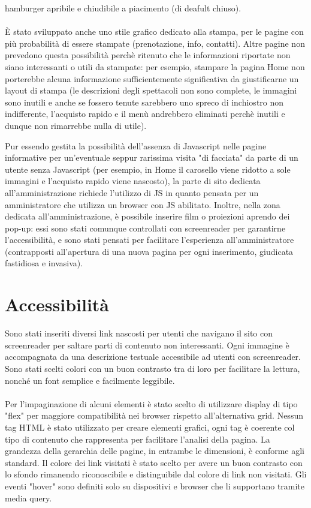 \documentclass[a4paper, 12pt]{article}
\begin{document}
hamburger apribile e chiudibile a piacimento (di deafult chiuso).\\\\
È stato sviluppato anche uno stile grafico dedicato alla stampa, per le pagine con più probabilità di essere stampate (prenotazione, info, contatti).
Altre pagine non prevedono questa possibilità perchè ritenuto che le informazioni riportate non siano interessanti o utili da stampate: per esempio, stampare la pagina Home non porterebbe alcuna informazione sufficientemente significativa da giustificarne un layout di stampa (le descrizioni degli spettacoli non sono complete, le immagini sono inutili e anche se fossero tenute sarebbero uno spreco di inchiostro
non indifferente, l'acquisto rapido e il menù andrebbero eliminati perchè inutili e dunque non rimarrebbe nulla di utile).

\newpage
Pur essendo gestita la possibilità dell'assenza di Javascript nelle pagine informative per un'eventuale seppur rarissima visita "di facciata" da parte di un utente senza Javascript (per esempio, in Home il carosello viene ridotto a sole immagini e l'acquisto rapido viene nascosto), la parte di sito dedicata all'amministrazione richiede l'utilizzo di JS in quanto pensata per un amministratore che utilizza un browser con JS abilitato. Inoltre, nella zona dedicata all'amministrazione, è possibile inserire film o proiezioni aprendo dei pop-up: essi sono stati comunque controllati con screenreader per garantirne l'accessibilità, e sono stati pensati per facilitare l'esperienza all'amministratore (contrapposti all'apertura di una nuova pagina per ogni inserimento, giudicata fastidiosa e invasiva).

\section{Accessibilità}
Sono stati inseriti diversi link nascosti per utenti che navigano il sito con screenreader per saltare parti di contenuto non interessanti.
Ogni immagine è accompagnata da una descrizione testuale accessibile ad utenti con screenreader.
Sono stati scelti colori con un buon contrasto tra di loro per facilitare la lettura, nonché un font semplice e facilmente leggibile.\\\\
Per l'impaginazione di alcuni elementi è stato scelto di utilizzare display di tipo "flex" per maggiore compatibilità nei browser rispetto all'alternativa grid.
Nessun tag HTML è stato utilizzato per creare elementi grafici, ogni tag è coerente col tipo di contenuto che rappresenta per facilitare l'analisi della pagina.
La grandezza della gerarchia delle pagine, in entrambe le dimensioni, è conforme agli standard.
Il colore dei link visitati è stato scelto per avere un buon contrasto con lo sfondo rimanendo riconoscibile e distinguibile dal colore di link non visitati.
Gli eventi "hover" sono definiti solo su dispositivi e browser che li supportano tramite media query.
\newpage
\end{document}
